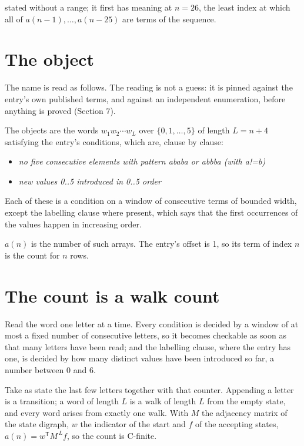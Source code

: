 \documentclass[11pt]{article}
\theoremstyle{definition}
\begin{document}
stated without a range; it first has meaning at $n = 26$, the least index at which all of $a(n-1),\dots,a(n-25)$ are terms of the sequence.

\section{The object}

The name is read as follows. The reading is not a guess: it is pinned against the entry's own published terms, and against an independent enumeration, before anything is proved (Section 7).

The objects are the words $w_1 w_2 \cdots w_L$ over $\{0,1,\dots,5\}$ of length $L = n + 4$ satisfying the entry's conditions, which are, clause by clause:

\begin{itemize}

\item {\itshape no five consecutive elements with pattern ababa or abbba (with a!=b)}

\item {\itshape new values 0..5 introduced in 0..5 order}

\end{itemize}

Each of these is a condition on a window of consecutive terms of bounded width, except the labelling clause where present, which says that the first occurrences of the values happen in increasing order.

$a(n)$ is the number of such arrays. The entry's offset is 1, so its term of index $n$ is the count for $n$ rows.

\section{The count is a walk count}

Read the word one letter at a time. Every condition is decided by a window of at most a fixed number of consecutive letters, so it becomes checkable as soon as that many letters have been read; and the labelling clause, where the entry has one, is decided by how many distinct values have been introduced so far, a number between $0$ and 6.

Take as state the last few letters together with that counter. Appending a letter is a transition; a word of length $L$ is a walk of length $L$ from the empty state, and every word arises from exactly one walk. With $M$ the adjacency matrix of the state digraph, $w$ the indicator of the start and $f$ of the accepting states, $a(n) = w^{\mathsf T}M^{\,L}f$, so the count is C-finite.
\end{document}
